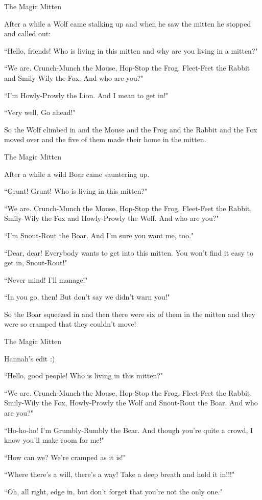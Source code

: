 \documentclass{article}
\begin{document}
The Magic Mitten

After a while a Wolf came stalking up and when he saw the mitten he stopped and called out:

``Hello, friends! Who is living in this mitten and why are you living in a mitten?"

``We are. Crunch-Munch the Mouse, Hop-Stop the Frog, Fleet-Feet the Rabbit and Smily-Wily the Fox. And who are you?"

``I'm Howly-Prowly the Lion. And I mean to get in!"

``Very well. Go ahead!"

So the Wolf climbed in and the Mouse and the Frog and the Rabbit and the Fox moved over and the five of them made their home in the mitten.

The Magic Mitten

After a while a wild Boar came sauntering up.

``Grunt! Grunt! Who is living in this mitten?"

``We are. Crunch-Munch the Mouse, Hop-Stop the Frog, Fleet-Feet the Rabbit, Smily-Wily the Fox and Howly-Prowly the Wolf. And who are you?"

``I'm Snout-Rout the Boar. And I'm sure you want me, too."

``Dear, dear! Everybody wants to get into this mitten. You won't find it easy to get in, Snout-Rout!"

``Never mind! I'll manage!"

``In you go, then! But don't say we didn't warn you!"

So the Boar squeezed in and then there were six of them in the mitten and they were so cramped that they couldn't move!

The Magic Mitten

Hannah's edit :)

``Hello, good people! Who is living in this mitten?"

``We are. Crunch-Munch the Mouse, Hop-Stop the Frog, Fleet-Feet the Rabbit, Smily-Wily the Fox, Howly-Prowly the Wolf and Snout-Rout the Boar. And who are you?"

``Ho-ho-ho! I'm Grumbly-Rumbly the Bear. And though you're quite a crowd, I know you'll make room for me!"

``How can we? We're cramped as it is!"

``Where there's a will, there's a way! Take a deep breath and hold it in!!!"

``Oh, all right, edge in, but don't forget that you're not the only one."
\end{document}
